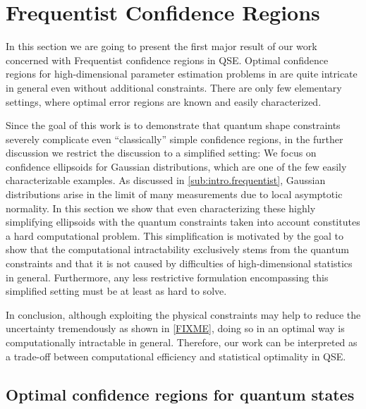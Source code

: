 









\section{Frequentist Confidence Regions}
\label{sec:error.frequentist}

In this section we are going to present the first major result of our work~\cite{Suess_2016_Error} concerned with Frequentist confidence regions in QSE.
Optimal confidence regions for high-dimensional parameter estimation problems in are quite intricate in general even without additional constraints.
There are only few elementary settings, where optimal error regions are known and easily characterized.

Since the goal of this work is to demonstrate that quantum shape constraints severely complicate even ``classically'' simple confidence regions, in the further discussion we restrict the discussion to a simplified setting:
We focus on confidence ellipsoids for Gaussian distributions, which are one of the few easily characterizable examples.
As discussed in \cref{sub:intro.frequentist}, Gaussian distributions arise in the limit of many measurements due to local asymptotic normality.
In this section we show that even characterizing these highly simplifying ellipsoids with the quantum constraints taken into account constitutes a hard computational problem.
This simplification is motivated by the goal to show that the computational intractability exclusively stems from the quantum constraints and that it is not caused by difficulties of high-dimensional statistics in general.
Furthermore, any less restrictive formulation encompassing this simplified setting must be at least as hard to solve.

In conclusion, although exploiting the physical constraints may help to reduce the uncertainty tremendously as shown in \cref{FIXME}, doing so in an optimal way is computationally intractable in general.
Therefore, our work can be interpreted as a trade-off between computational efficiency and statistical optimality in QSE.

\subsection{Optimal confidence regions for quantum states}
\label{sub:ortho.optimal}

